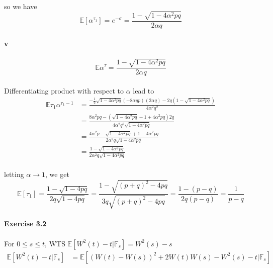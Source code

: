\documentclass{article}
\begin{document}
\paragraph{}{so we have \begin{displaymath}
                          \mathbb{E}[\alpha^{\tau_{1}}]=e^{-\sigma}=\frac{1- \sqrt{1-4\alpha^{2}pq}}{2\alpha q}
                        \end{displaymath}}
\paragraph{v}{}
\begin{displaymath}
  \mathbb{E}\alpha ^{\tau}=\frac{1-\sqrt{1-4\alpha^2pq}}{2\alpha q}
\end{displaymath}
\paragraph{}{Differentiating product with respect to $\alpha$ lead to}
\begin{align*}
  \mathbb{E}\tau_{1}\alpha^{\tau_{1}-1} &= \frac{-\frac{1}{2}\sqrt{1-4\alpha^2pq}(-8\alpha qp)(2\alpha q)-2q(1-\sqrt{1-4\alpha^2pq})}{4\alpha^2q^2} \\
   &= \frac{8\alpha^2pq-(\sqrt{1-4\alpha^2pq}-1+4\alpha^2pq)2q}{4\alpha^2q^2\sqrt{1-4\alpha^2pq}} \\
   &=\frac{4\alpha^2p-\sqrt{1-4\alpha^2pq}+1-4\alpha^2pq}{2\alpha^2q\sqrt{1-4\alpha^2pq}} \\
   &= \frac{1-\sqrt{1-4\alpha^2pq}}{2\alpha^2q\sqrt{1-4\alpha^2pq}}
\end{align*}
\paragraph{}{letting $\alpha \to 1$, we get \begin{displaymath}
                                              \mathbb{E}[\tau_1]=\frac{1-\sqrt{1-4pq}}{2q\sqrt{1-4pq}}=\frac{1-\sqrt{(p+q)^2-4pq}}{3q\sqrt{(p+q)^2-4pq}}=\frac{1-(p-q)}{2q(p-q)}=\frac{1}{p-q}
                                            \end{displaymath}}
\paragraph{Exercise 3.2}{}
\paragraph{}{For $0\le s\le t$, WTS $\mathbb{E}[W^{2}(t)-t|\mathbb{F}_{s}]=W^{2}(s)-s$}
\begin{align*}
\mathbb{E}[W^{2}(t)-t|\mathbb{F}_{s}]& =\mathbb{E}[(W(t)-W(s))^{2}+2W(t)W(s)-W^{2}(s)-t|\mathbb{F}_{s}]   \end{align*}
\end{document}
